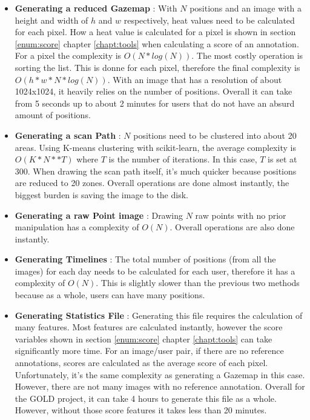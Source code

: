 \documentclass[a4paper,11pt]{report}
\numberwithin{figure}{chapter} %
\begin{document}
    \begin{itemize}
        \item[\textbullet] \textbf{Generating a reduced Gazemap}  : With $N$ positions and an image with a height and width of $h$ and $w$ respectively, heat values need to be calculated for each pixel.
        How a heat value is calculated for a pixel is shown in section \ref{enum:score} chapter \ref{chapt:tools} when calculating a score of an annotation.
        For a pixel the complexity is $O(N*log(N))$.
        The most costly operation is sorting the list.
        This is donne for each pixel, therefore the final complexity is $O(h*w*N*log(N))$.
        With an image that has a resolution of about 1024x1024, it heavily relies on the number of positions.
        Overall it can take from 5 seconds up to about 2 minutes for users that do not have an absurd amount of positions.
        \item[\textbullet] \textbf{Generating a scan Path} : $N$ positions need to be clustered into about 20 areas.
        Using K-means clustering with scikit-learn, the average complexity is $O(K*N**T)$ where $T$ is the number of iterations.
        In this case, $T$ is set at 300.
        When drawing the scan path itself, it's much quicker because positions are reduced to 20 zones.
        Overall operations are done almost instantly, the biggest burden is saving the image to the disk.
        \item[\textbullet] \textbf{Generating a raw Point image} : Drawing $N$ raw points with no prior manipulation has a complexity of $O(N)$.
        Overall operations are also done instantly.
        \item[\textbullet] \textbf{Generating Timelines} : The total number of positions (from all the images) for each day needs to be calculated for each user, therefore it has a complexity of $O(N)$.
        This is slightly slower than the previous two methods because as a whole, users can have many positions.
        \item[\textbullet] \textbf{Generating Statistics File} : Generating this file requires the calculation of many features.
        Most features are calculated instantly, however the score variables shown in section \ref{enum:score} chapter \ref{chapt:tools}  can take significantly more time.
        For an image/user pair, if there are no reference annotations, scores are calculated as the average score of each pixel.
        Unfortunately, it's the same complexity as generating a Gazemap in this case.
        However, there are not many images with no reference annotation.
        Overall for the GOLD project, it can take 4 hours to generate this file as a whole.
        However, without those score features it takes less than 20 minutes.
    \end{itemize}
\end{document}
